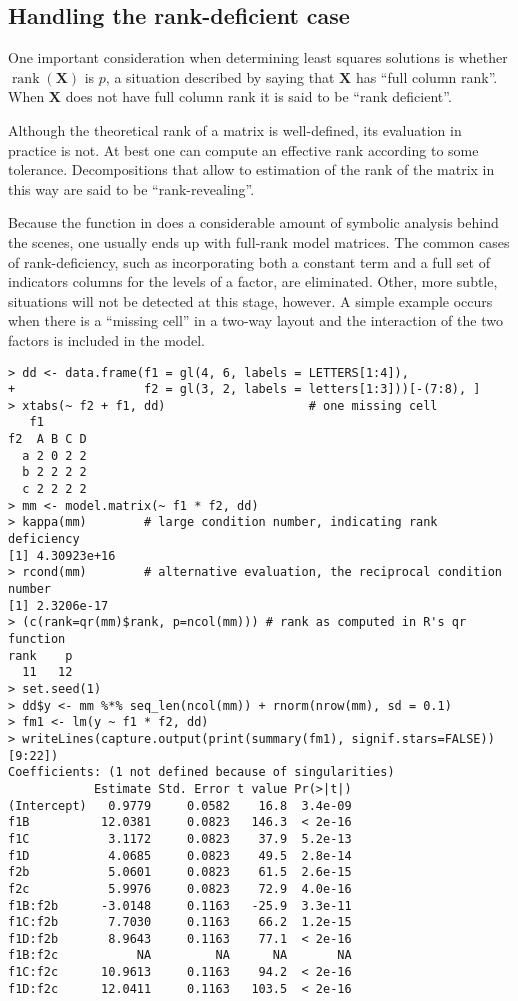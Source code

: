 \documentclass[shortnames,article]{jss}
\newcommand{\rank}{\operatorname{rank}}
\begin{document}
\subsection{Handling the rank-deficient case}
\label{sec:rankdeficient}

One important consideration when determining least squares solutions
is whether $\rank(\bm X)$ is $p$, a situation described by saying
that $\bm X$ has ``full column rank''.   When $\bm X$ does not have
full column rank it is said to be ``rank deficient''.

Although the theoretical rank of a matrix is well-defined, its
evaluation in practice is not.  At best one can compute an effective
rank according to some tolerance.  Decompositions that allow to
estimation of the rank of the matrix in this way are said to be
``rank-revealing''.

Because the  function in  does a
considerable amount of symbolic analysis behind the scenes, one usually
ends up with full-rank model matrices.  The common cases of
rank-deficiency, such as incorporating both a constant term and a full
set of indicators columns for the levels of a factor, are eliminated.
Other, more subtle, situations will not be detected at this stage,
however.  A simple example occurs when there is a ``missing cell'' in a
two-way layout and the interaction of the two factors is included in
the model.

\begin{verbatim}
> dd <- data.frame(f1 = gl(4, 6, labels = LETTERS[1:4]),
+                  f2 = gl(3, 2, labels = letters[1:3]))[-(7:8), ]
> xtabs(~ f2 + f1, dd)                    # one missing cell
   f1
f2  A B C D
  a 2 0 2 2
  b 2 2 2 2
  c 2 2 2 2
> mm <- model.matrix(~ f1 * f2, dd)
> kappa(mm)        # large condition number, indicating rank deficiency
[1] 4.30923e+16
> rcond(mm)        # alternative evaluation, the reciprocal condition number
[1] 2.3206e-17
> (c(rank=qr(mm)$rank, p=ncol(mm))) # rank as computed in R's qr function
rank    p 
  11   12 
> set.seed(1)
> dd$y <- mm %*% seq_len(ncol(mm)) + rnorm(nrow(mm), sd = 0.1)
> fm1 <- lm(y ~ f1 * f2, dd)
> writeLines(capture.output(print(summary(fm1), signif.stars=FALSE))[9:22])
Coefficients: (1 not defined because of singularities)
            Estimate Std. Error t value Pr(>|t|)
(Intercept)   0.9779     0.0582    16.8  3.4e-09
f1B          12.0381     0.0823   146.3  < 2e-16
f1C           3.1172     0.0823    37.9  5.2e-13
f1D           4.0685     0.0823    49.5  2.8e-14
f2b           5.0601     0.0823    61.5  2.6e-15
f2c           5.9976     0.0823    72.9  4.0e-16
f1B:f2b      -3.0148     0.1163   -25.9  3.3e-11
f1C:f2b       7.7030     0.1163    66.2  1.2e-15
f1D:f2b       8.9643     0.1163    77.1  < 2e-16
f1B:f2c           NA         NA      NA       NA
f1C:f2c      10.9613     0.1163    94.2  < 2e-16
f1D:f2c      12.0411     0.1163   103.5  < 2e-16
\end{verbatim}
\end{document}
